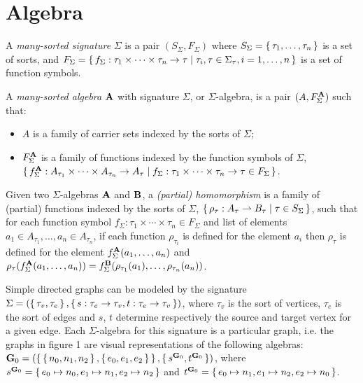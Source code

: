 \section{Algebra}

\begin{definition}
  A \emph{many-sorted signature} $\Sigma$ is a pair $(S_\Sigma, F_\Sigma)$ where $S_\Sigma = \set{\tau_1, \ldots,
  \tau_n}$ is a set of sorts, and $F_\Sigma = \set{f_\Sigma : \tau_1 \times \cdots \times \tau_n \to \tau | \tau_i, \tau
  \in \Sigma_\tau, i = 1, \ldots, n}$ is a set of function symbols.
\end{definition}

\begin{definition}
  A \emph{many-sorted algebra} $\mathbf{A}$ with signature $\Sigma$, or $\Sigma$-algebra, is a pair $(A,
  F_\Sigma^{\mathbf{A}})$ such that:
  \begin{itemize}
    \item $A$ is a family of carrier sets indexed by the sorts of $\Sigma$;
    \item $F_\Sigma^{\mathbf{A}}$ is a family of functions indexed by the function symbols of $\Sigma$,
      $\set{f_\Sigma^{\mathbf{A}} : A_{\tau_1} \times \cdots \times A_{\tau_n} \to A_\tau | f_\Sigma : \tau_1 \times
      \cdots \times \tau_n \to \tau \in F_\Sigma}$.
  \end{itemize}
\end{definition}

\begin{definition}[Homomorphism]
  Given two $\Sigma$-algebras $\mathbf{A}$ and $\mathbf{B}$, a \emph{(partial)
  homomorphism} is a family of (partial) functions indexed by the sorts of $\Sigma$, $\set{\rho_\tau : A_\tau
  \rightharpoonup B_\tau | \tau \in S_\Sigma}$, such that for each function symbol $f_\Sigma : \tau_1 \times \cdots \times
  \tau_n \in F_\Sigma$ and list of elements $a_1 \in A_{\tau_1}, \ldots, a_n \in A_{\tau_n}$, if each function
  $\rho_{\tau_i}$ is defined for the element $a_i$ then $\rho_\tau$ is defined for the element $f_\Sigma^{\mathbf{A}}(a_1,
  \ldots, a_n)$ and $\rho_\tau(f_\Sigma^{\mathbf{A}}(a_1, \ldots, a_n)) = f_\Sigma^{\mathbf{B}}(\rho_{\tau_1}(a_1),
  \ldots, \rho_{\tau_n}(a_n))$.
\end{definition}

\begin{example}
  Simple directed graphs can be modeled by the signature $\Sigma = (\set{\tau_v, \tau_e}, \set{s : \tau_e \to \tau_v, t
  : \tau_e \to \tau_v})$, where $\tau_v$ is the sort of vertices, $\tau_e$ is the sort of edges and $s$, $t$ determine
  respectively the source and target vertex for a given edge. Each $\Sigma$-algebra for this signature is a particular
  graph, i.e. the graphs in figure 1 are visual representations of the following algebras: $\mathbf{G}_0 =
  (\set{\set{n_0, n_1, n_2},\set{e_0, e_1, e_2}}, \set{s^{\mathbf{G}_0}, t^{\mathbf{G}_0}})$, where $s^{\mathbf{G}_0} =
  \set{e_0 \mapsto n_0, e_1 \mapsto n_1, e_2 \mapsto n_2}$ and $t^{\mathbf{G}_0} = \set{e_0 \mapsto n_1, e_1 \mapsto
  n_2, e_2 \mapsto n_0}$.
\end{example}

